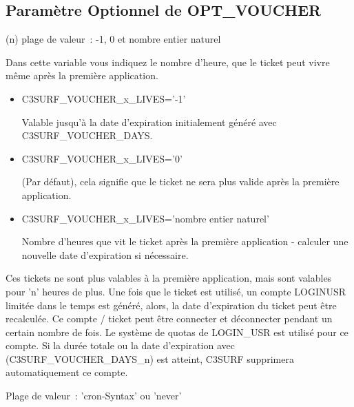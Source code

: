 \subsection {Paramètre Optionnel de OPT\_VOUCHER}

\begin{description}



   (n) plage de valeur~: -1, 0 et nombre entier naturel

  Dans cette variable vous indiquez le nombre d'heure, que le ticket peut vivre même après
  la première application.


\begin{itemize}
   \item{C3SURF\_VOUCHER\_x\_LIVES='-1'}

         Valable jusqu'à la date d'expiration initialement généré avec C3SURF\_VOUCHER\_DAYS.
   \item{C3SURF\_VOUCHER\_x\_LIVES='0'}

         (Par défaut), cela signifie que le ticket ne sera plus valide après la première application.
    \item{C3SURF\_VOUCHER\_x\_LIVES='nombre entier naturel'}

          Nombre d'heures que vit le ticket après la première application - calculer une nouvelle date
		  d'expiration si nécessaire.
\end{itemize}
\parskip 12pt

  Ces tickets ne sont plus valables à la première application, mais sont valables pour 'n' heures de plus.
  Une fois que le ticket est utilisé, un compte LOGINUSR limitée dans le temps est généré, alors,
  la date d'expiration du ticket peut être recalculée. Ce compte / ticket peut être connecter et déconnecter
  pendant un certain nombre de fois. Le système de quotas de LOGIN\_USR est utilisé pour ce compte. Si
  la durée totale ou la date d'expiration avec (C3SURF\_VOUCHER\_DAYS\_n) est atteint, C3SURF supprimera
  automatiquement ce compte.



   Plage de valeur~: 'cron-Syntax' ou 'never'


\end{description}
